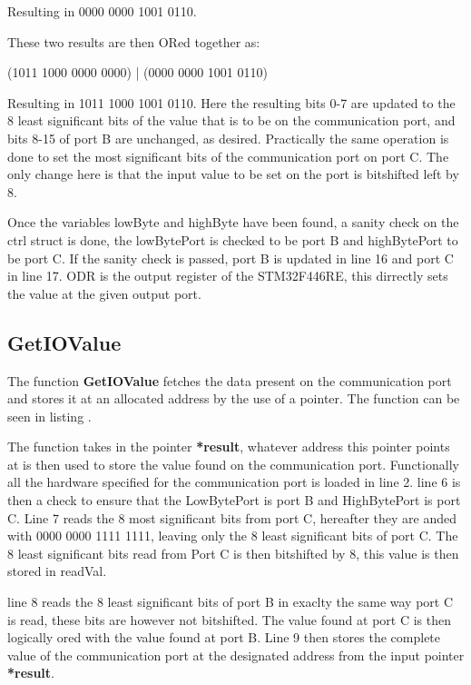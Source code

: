 Resulting in 0000 0000 1001 0110. 

These two results are then ORed together as:

(1011 1000 0000 0000) | (0000 0000 1001 0110) 

Resulting in 1011 1000 1001 0110. Here the resulting bits 0-7 are updated to the 8 least significant bits of the value that is to be on the communication port, and bits 8-15 of port B are unchanged, as desired. Practically the same operation is done to set the most significant bits of the communication port on port C. The only change here is that the input value to be set on the port is bitshifted left by 8.

Once the variables lowByte and highByte have been found, a sanity check on the ctrl struct is done, the lowBytePort is checked to be port B and highBytePort to be port C. If the sanity check is passed, port B is updated in line 16 and port C in line 17. ODR is the output register of the STM32F446RE, this dirrectly sets the value at the given output port.

\subsection*{GetIOValue}
The function \textbf{GetIOValue} fetches the data present on the communication port and stores it at an allocated address by the use of a pointer. The function can be seen in listing .



The function takes in the pointer \textbf{*result}, whatever address this pointer points at is then used to store the value found on the communication port. Functionally all the hardware specified for the communication port is loaded in line 2. line 6 is then a check to ensure that the LowBytePort is port B and HighBytePort is port C. Line 7 reads the 8 most significant bits from port C, hereafter they are anded with 0000 0000 1111 1111, leaving only the 8 least significant bits of port C. The 8 least significant bits read from Port C is then bitshifted by 8, this value is then stored in readVal.

line 8 reads the 8 least significant bits of port B in exaclty the same way port C is read, these bits are however not bitshifted. The value found at port C is then logically ored with the value found at port B. Line 9 then stores the complete value of the communication port at the designated address from the input pointer \textbf{*result}.

